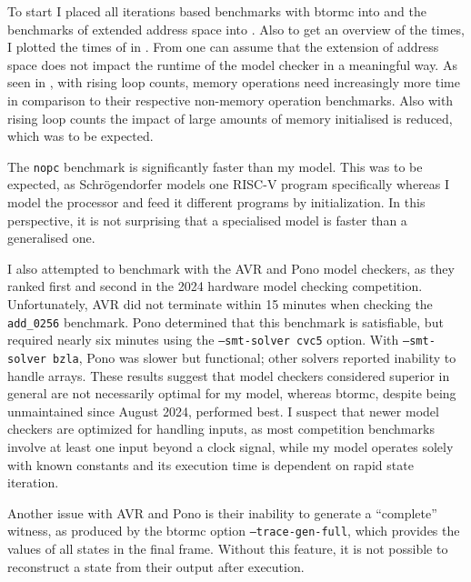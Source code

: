 To start I placed all iterations based benchmarks with btormc into
 and the benchmarks of extended address space
into . Also to get an overview of the times,
I plotted the times of  in
. From  one can
assume that the extension of address space does not impact the
runtime of the model checker in a meaningful way. As seen in
, with rising loop counts, memory operations
need increasingly more time in comparison to their respective
non-memory operation benchmarks. Also with rising loop counts the
impact of large amounts of memory initialised is reduced, which was
to be expected.

The \texttt{nopc} benchmark is significantly faster than my model.
This was to be expected, as Schrögendorfer models one RISC-V program
specifically whereas I model the processor and feed it different
programs by initialization. In this perspective, it is not surprising
that a specialised model is faster than a generalised one.





I also attempted to benchmark with the AVR and Pono model checkers,
as they ranked first and second in the 2024 hardware model checking
competition. Unfortunately, AVR did not terminate within 15 minutes
when checking the \texttt{add\_0256} benchmark. Pono determined that
this benchmark is satisfiable, but required nearly six minutes using
the \texttt{--smt-solver cvc5} option. With \texttt{--smt-solver
        bzla}, Pono was slower but functional; other solvers reported
inability to handle arrays. These results suggest that model checkers
considered superior in general are not necessarily optimal for my
model, whereas btormc, despite being unmaintained since August 2024,
performed best. I suspect that newer model checkers are optimized for
handling inputs, as most competition benchmarks involve at least one
input beyond a clock signal, while my model operates solely with
known constants and its execution time is dependent on rapid state
iteration.

Another issue with AVR and Pono is their inability to generate a
\enquote{complete} witness, as produced by the btormc option
\texttt{--trace-gen-full}, which provides the values of all states in
the final frame. Without this feature, it is not possible to
reconstruct a state from their output after execution.

%